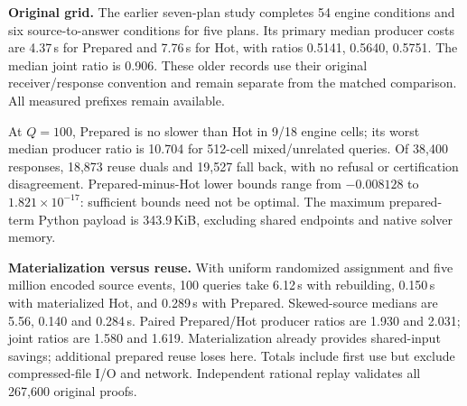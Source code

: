 \textbf{Original grid.} The earlier seven-plan study completes 54 engine conditions and six source-to-answer conditions for five plans. Its primary median producer costs are 4.37\,s for Prepared and 7.76\,s for Hot, with ratios 0.5141, 0.5640, 0.5751. The median joint ratio is 0.906. These older records use their original receiver/response convention and remain separate from the matched comparison. All measured prefixes remain available.

At $Q=100$, Prepared is no slower than Hot in 9/18 engine cells; its worst median producer ratio is 10.704 for 512-cell mixed/unrelated queries. Of 38,400 responses, 18,873 reuse duals and 19,527 fall back, with no refusal or certification disagreement. Prepared-minus-Hot lower bounds range from $-0.008128$ to $1.821\times10^{-17}$: sufficient bounds need not be optimal. The maximum prepared-term Python payload is 343.9\,KiB, excluding shared endpoints and native solver memory.

\textbf{Materialization versus reuse.} With uniform randomized assignment and five million encoded source events, 100 queries take 6.12\,s with rebuilding, 0.150\,s with materialized Hot, and 0.289\,s with Prepared. Skewed-source medians are 5.56, 0.140 and 0.284\,s. Paired Prepared/Hot producer ratios are 1.930 and 2.031; joint ratios are 1.580 and 1.619. Materialization already provides shared-input savings; additional prepared reuse loses here. Totals include first use but exclude compressed-file I/O and network. Independent rational replay validates all 267,600 original proofs.
